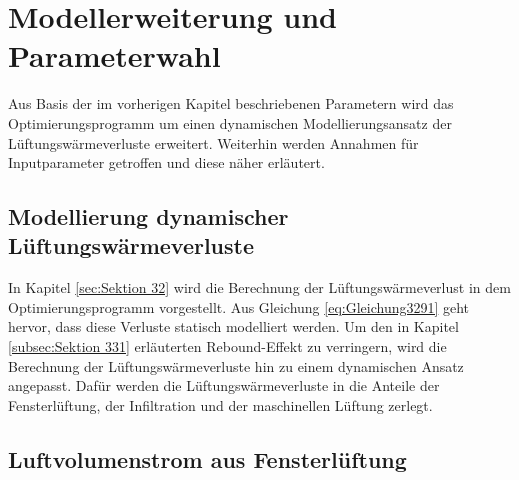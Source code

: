 \chapter{Modellerweiterung und Parameterwahl}

Aus Basis der im vorherigen Kapitel beschriebenen Parametern wird das Optimierungsprogramm um einen dynamischen Modellierungsansatz der Lüftungswärmeverluste erweitert.
Weiterhin werden Annahmen für Inputparameter getroffen und diese näher erläutert.

\section{Modellierung dynamischer Lüftungswärmeverluste}
\label{sec:Sektion 51}

In Kapitel \ref{sec:Sektion 32} wird die Berechnung der Lüftungswärmeverlust in dem Optimierungsprogramm vorgestellt.
Aus Gleichung \ref{eq:Gleichung3291} geht hervor, dass diese Verluste statisch modelliert werden.
Um den in Kapitel \ref{subsec:Sektion 331} erläuterten Rebound-Effekt zu verringern, wird die Berechnung der Lüftungswärmeverluste hin zu einem dynamischen Ansatz angepasst.
Dafür werden die Lüftungswärmeverluste in die Anteile der Fensterlüftung, der Infiltration und der maschinellen Lüftung zerlegt.

\section*{Luftvolumenstrom aus Fensterlüftung}

